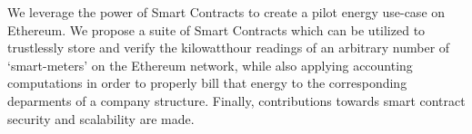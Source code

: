 We leverage the power of Smart Contracts to create a pilot energy use-case on Ethereum. We propose a suite of Smart Contracts which can be utilized to trustlessly store and verify the kilowatthour readings of an arbitrary number of `smart-meters' on the Ethereum network, while also applying accounting computations in order to properly bill that energy to the corresponding deparments of a company structure. Finally, contributions towards smart contract security and scalability are made.
